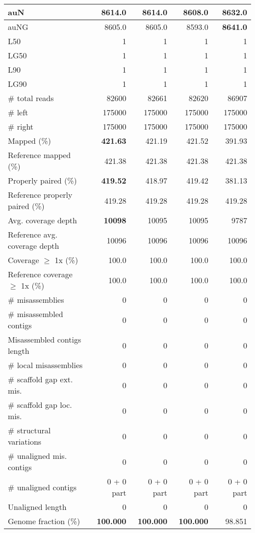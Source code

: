 \documentclass[12pt,a4paper]{article}
\begin{document}
\begin{table}[ht]
\begin{center}
\begin{tabular}{|l*{4}{|r}|}
auN & 8614.0 & 8614.0 & 8608.0 & {\bf 8632.0} \\ \hline
auNG & 8605.0 & 8605.0 & 8593.0 & {\bf 8641.0} \\ \hline
L50 & 1 & 1 & 1 & 1 \\ \hline
LG50 & 1 & 1 & 1 & 1 \\ \hline
L90 & 1 & 1 & 1 & 1 \\ \hline
LG90 & 1 & 1 & 1 & 1 \\ \hline
\# total reads & 82600 & 82661 & 82620 & 86907 \\ \hline
\# left & 175000 & 175000 & 175000 & 175000 \\ \hline
\# right & 175000 & 175000 & 175000 & 175000 \\ \hline
Mapped (\%) & {\bf 421.63} & 421.19 & 421.52 & 391.93 \\ \hline
Reference mapped (\%) & 421.38 & 421.38 & 421.38 & 421.38 \\ \hline
Properly paired (\%) & {\bf 419.52} & 418.97 & 419.42 & 381.13 \\ \hline
Reference properly paired (\%) & 419.28 & 419.28 & 419.28 & 419.28 \\ \hline
Avg. coverage depth & {\bf 10098} & 10095 & 10095 & 9787 \\ \hline
Reference avg. coverage depth & 10096 & 10096 & 10096 & 10096 \\ \hline
Coverage $\geq$ 1x (\%) & 100.0 & 100.0 & 100.0 & 100.0 \\ \hline
Reference coverage $\geq$ 1x (\%) & 100.0 & 100.0 & 100.0 & 100.0 \\ \hline
\# misassemblies & 0 & 0 & 0 & 0 \\ \hline
\# misassembled contigs & 0 & 0 & 0 & 0 \\ \hline
Misassembled contigs length & 0 & 0 & 0 & 0 \\ \hline
\# local misassemblies & 0 & 0 & 0 & 0 \\ \hline
\# scaffold gap ext. mis. & 0 & 0 & 0 & 0 \\ \hline
\# scaffold gap loc. mis. & 0 & 0 & 0 & 0 \\ \hline
\# structural variations & 0 & 0 & 0 & 0 \\ \hline
\# unaligned mis. contigs & 0 & 0 & 0 & 0 \\ \hline
\# unaligned contigs & 0 + 0 part & 0 + 0 part & 0 + 0 part & 0 + 0 part \\ \hline
Unaligned length & 0 & 0 & 0 & 0 \\ \hline
Genome fraction (\%) & {\bf 100.000} & {\bf 100.000} & {\bf 100.000} & 98.851 \\ \hline

\end{tabular}
\end{center}
\end{table}
\end{document}
